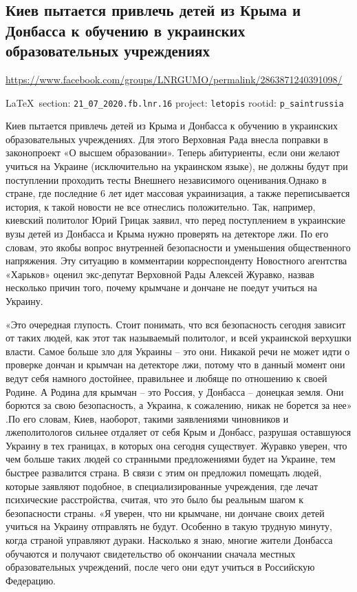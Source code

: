  
 
\subsection{Киев пытается привлечь детей из Крыма и Донбасса к обучению в украинских образовательных учреждениях}
\url{https://www.facebook.com/groups/LNRGUMO/permalink/2863871240391098/}
  
\vspace{0.5cm}
{\small\LaTeX~section: \verb|21_07_2020.fb.lnr.16| project: \verb|letopis| rootid: \verb|p_saintrussia|}
\vspace{0.5cm}
  
Киев пытается привлечь детей из Крыма и Донбасса к обучению в украинских
образовательных учреждениях. Для этого Верховная Рада внесла поправки в
законопроект «О высшем образовании». Теперь абитуриенты, если они желают
учиться на Украине (исключительно на украинском языке), не должны будут при
поступлении проходить тесты Внешнего независимого оценивания.Однако в стране,
где последние 6 лет идет массовая украинизация, а также переписывается история,
к такой новости не все отнеслись положительно. Так, например, киевский
политолог Юрий Грицак заявил, что перед поступлением в украинские вузы детей из
Донбасса и Крыма нужно проверять на детекторе лжи. По его словам, это якобы
вопрос внутренней безопасности и уменьшения общественного напряжения. Эту
ситуацию в комментарии корреспонденту Новостного агентства «Харьков» оценил
экс-депутат Верховной Рады Алексей Журавко, назвав несколько причин того,
почему крымчане и дончане не поедут учиться на Украину.

«Это очередная глупость. Стоит понимать, что вся безопасность сегодня зависит
от таких людей, как этот так называемый политолог, и всей украинской верхушки
власти. Самое больше зло для Украины – это они.  Никакой речи не может идти о
проверке дончан и крымчан на детекторе лжи, потому что в данный момент они
ведут себя намного достойнее, правильнее и любяще по отношению к своей Родине.
А Родина для крымчан – это Россия, у Донбасса – донецкая земля. Они борются за
свою безопасность, а Украина, к сожалению, никак не борется за нее» .По его
словам, Киев, наоборот, такими заявлениями чиновников и лжеполитологов сильнее
отдаляет от себя Крым и Донбасс, разрушая оставшуюся Украину в тех границах, в
которых она сегодня существует. Журавко уверен, что чем больше таких людей со
странными предложениями будет на Украине, тем быстрее развалится страна. В
связи с этим он предложил помещать людей, которые заявляют подобное, в
специализированные учреждения, где лечат психические расстройства, считая, что
это было бы реальным шагом к безопасности страны.  «Я уверен, что ни крымчане,
ни дончане своих детей учиться на Украину отправлять не будут. Особенно в такую
трудную минуту, когда страной управляют дураки. Насколько я знаю, многие жители
Донбасса обучаются и получают свидетельство об окончании сначала местных
образовательных учреждений, после чего они едут учиться в Российскую Федерацию.


